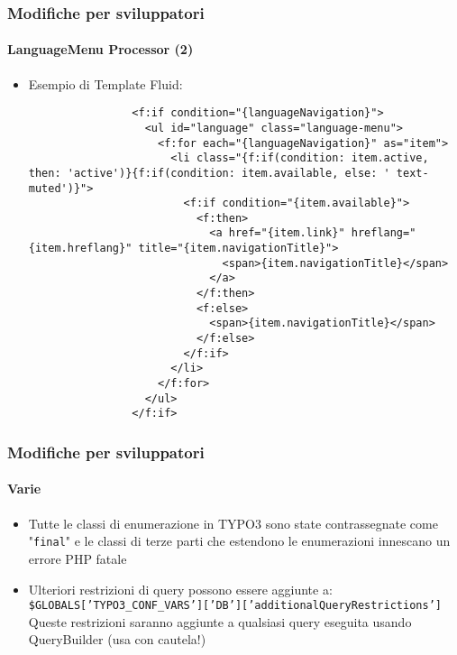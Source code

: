 \begin{frame}[fragile]
	\frametitle{Modifiche per sviluppatori}
	\framesubtitle{LanguageMenu Processor (2)}

	\lstset{basicstyle=\tiny\ttfamily}

	\begin{itemize}
		\item Esempio di Template Fluid:

			\begin{lstlisting}
				<f:if condition="{languageNavigation}">
				  <ul id="language" class="language-menu">
				    <f:for each="{languageNavigation}" as="item">
				      <li class="{f:if(condition: item.active, then: 'active')}{f:if(condition: item.available, else: ' text-muted')}">
				        <f:if condition="{item.available}">
				          <f:then>
				            <a href="{item.link}" hreflang="{item.hreflang}" title="{item.navigationTitle}">
				              <span>{item.navigationTitle}</span>
				            </a>
				          </f:then>
				          <f:else>
				            <span>{item.navigationTitle}</span>
				          </f:else>
				        </f:if>
				      </li>
				    </f:for>
				  </ul>
				</f:if>
			\end{lstlisting}

	\end{itemize}

\end{frame}


\begin{frame}[fragile]
	\frametitle{Modifiche per sviluppatori}
	\framesubtitle{Varie}

	\begin{itemize}
		\item Tutte le classi di enumerazione in TYPO3 sono state contrassegnate  come "\texttt{final}"
			e le classi di terze parti che estendono le enumerazioni innescano un errore PHP fatale
		\item Ulteriori restrizioni di query possono essere aggiunte a:\newline
			\smaller
				\texttt{\$GLOBALS['TYPO3\_CONF\_VARS']['DB']['additionalQueryRestrictions']}
			\normalsize\newline
			Queste restrizioni saranno aggiunte a qualsiasi query eseguita
			usando QueryBuilder (usa con cautela!)

	\end{itemize}

\end{frame}

